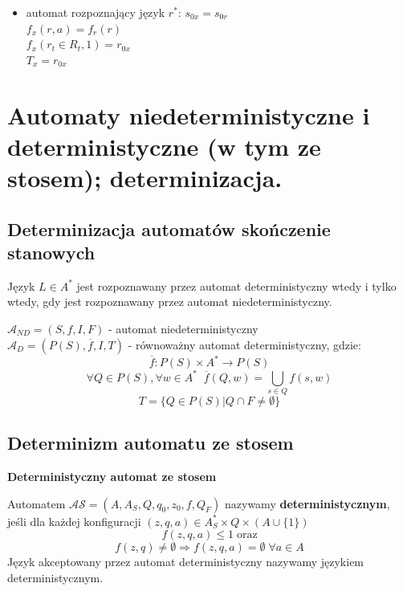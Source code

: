 \documentclass[12pt]{article}
\begin{document}
\begin{itemize}
\begin{itemize}
            \item automat rozpoznający język $r^*$:
            \noindent $s_{0x} = s_{0r}$\\
            \noindent $f_x(r, a) = f_r(r)$ \\
            \noindent $f_x(r_t \in R_t, 1) = r_{0x}$ \\
            \noindent $T_x = r_{0x}$ \\
        \end{itemize}
    \end{itemize}
    \newpage

    \section{Automaty niedeterministyczne i deterministyczne (w tym ze stosem); determinizacja.}

    \subsection{Determinizacja automatów skończenie stanowych}

    \begin{theorem}
        Język $L \in A^*$ jest rozpoznawany przez automat deterministyczny wtedy
        i tylko wtedy, gdy jest rozpoznawany przez automat niedeterministyczny.
    \end{theorem}

    $\mathcal{A}_{ND} = (S, f, I, F)$ - automat niedeterministyczny\\
    \indent$\mathcal{A}_D = (P(S), \overline{f}, I, T)$ - równoważny automat deterministyczny, gdzie:
    $$\overline{f} : P(S) \times A^* \rightarrow P(S)$$
    $$\forall Q \in P(S), \forall w \in A^* \; \; \overline{f}(Q, w) = \bigcup\limits_{s \in Q} f(s, w)$$
    $$T = \{Q \in P(S) | Q \cap F \neq \emptyset\}$$

    \subsection{Determinizm automatu ze stosem}

    \begin{definition}
        \textbf{Deterministyczny automat ze stosem}

        Automatem $\mathcal{AS} = (A, A_S, Q, q_0, z_0, f, Q_F)$ nazywamy
        \textbf{deterministycznym}, jeśli dla każdej konfiguracji
        $(z, q, a) \in A_S^* \times Q \times (A \cup \{1\})$
        $$f(z, q, a) \leq 1 \; \mathrm{oraz}$$
        $$f(z, q) \neq \emptyset \Rightarrow f(z, q, a) = \emptyset \; \forall a \in A$$
        Język akceptowany przez automat deterministyczny nazywamy językiem deterministycznym.
    \end{definition}
\end{document}
